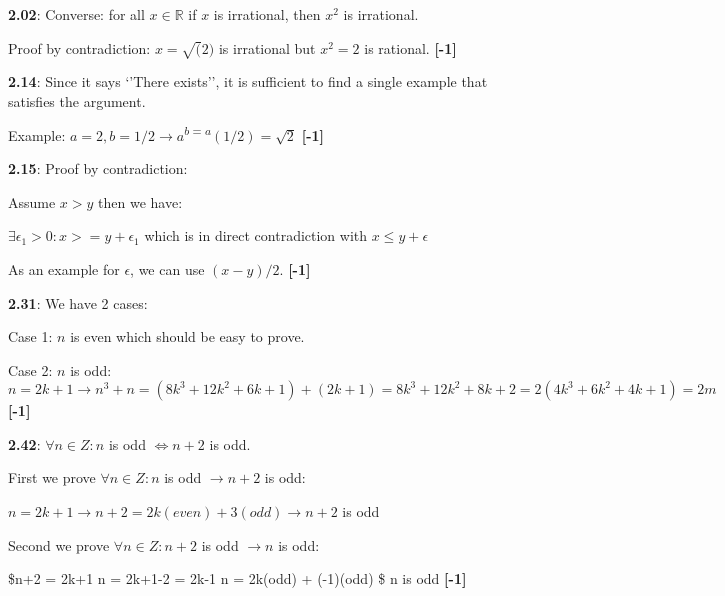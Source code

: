 \documentclass[11pt]{article}
\begin{document}
    
    \textbf{2.02}: Converse: for all \(x \in \mathbb{R}\) if \(x\) is
irrational, then \(x^2\) is irrational.

Proof by contradiction: \(x = \sqrt(2)\) is irrational but \(x^2 = 2\)
is rational. \textbf{{[}-1{]}}

    
    \textbf{2.14}: Since it says `'There exists'', it is sufficient to find
a single example that satisfies the argument.

Example:
\(a = 2, b = 1/2 \rightarrow a\)\textsuperscript{\(b = a\)}\((1/2) = \sqrt{2}\)
\textbf{{[}-1{]}}

    
    \textbf{2.15}: Proof by contradiction:

Assume \(x > y\) then we have:

\(\exists \epsilon_1 > 0: x >= y + \epsilon_1\) which is in direct
contradiction with \(x \leq y + \epsilon\)

As an example for \(\epsilon\), we can use \((x-y)/{2}\).
\textbf{{[}-1{]}}

    
    \textbf{2.31}: We have 2 cases:

Case 1: \(n\) is even which should be easy to prove.

Case 2: \(n\) is odd:
\(n = 2k+1 \rightarrow n^3 + n = (8k^3 + 12k^2 + 6k+1) + (2k+1) = 8k^3 + 12k^2+8k + 2 = 2(4k^3+6k^2+4k+1) = 2m\)
\textbf{{[}-1{]}}

    
    \textbf{2.42}: \(\forall n \in Z: n\) is odd \(\iff n+2\) is odd.

First we prove \(\forall n \in Z: n\) is odd \(\rightarrow n+2\) is odd:

\(n = 2k+1 \rightarrow n+2 = 2k(even)+3(odd) \rightarrow n+2\) is odd

Second we prove \(\forall n \in Z: n+2\) is odd \(\rightarrow n\) is
odd:

\$n+2 = 2k+1 \rightarrow n = 2k+1-2 = 2k-1 \rightarrow n = 2k(odd) +
(-1)(odd) \rightarrow \$ n is odd \textbf{{[}-1{]}}

    

    
    
    
    
\end{document}
